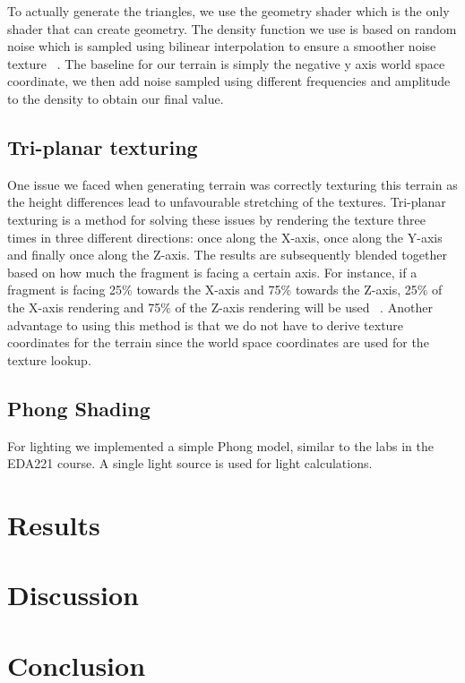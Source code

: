 \documentclass{acmsiggraph}               %
\begin{document}
To actually generate the triangles, we use the geometry shader which is the only shader that can
create geometry. The density function we use is based on random noise which is sampled using
bilinear interpolation to ensure a smoother noise texture ~\cite{lodev}. The baseline for our
terrain is simply the negative y axis world space coordinate, we then add noise sampled using
different frequencies and amplitude to the density to obtain our final value.

\subsection{Tri-planar texturing}
One issue we faced when generating terrain was correctly texturing this terrain as the height
differences lead to unfavourable stretching of the textures. Tri-planar texturing is a method
for solving these issues by rendering the texture three times in three different directions:
once along the X-axis, once along the Y-axis and finally once along the Z-axis. The results
are subsequently blended together based on how much the fragment is facing a certain axis. For
instance, if a fragment is facing 25\% towards the X-axis and 75\% towards the Z-axis, 25\% of
the X-axis rendering and 75\% of the Z-axis rendering will be used ~\cite{Owens2014}.
Another advantage to using this method is that we do not have to derive texture coordinates for
the terrain since the world space coordinates are used for the texture lookup.

\subsection{Phong Shading}
For lighting we implemented a simple Phong model, similar to the labs in the EDA221 course. A
single light source is used for light calculations.

\section{Results}

\section{Discussion}

\section{Conclusion}
\end{document}
